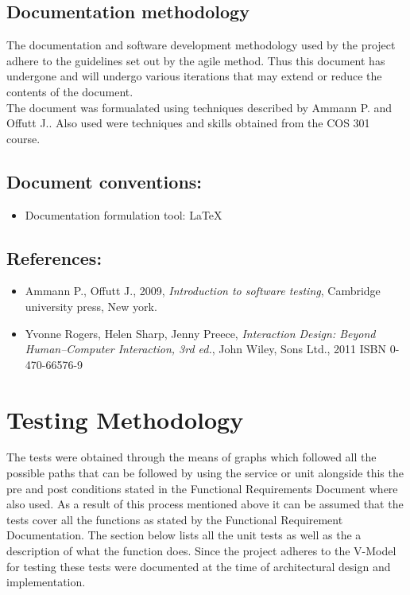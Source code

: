 \documentclass[12pt]{article}
\begin{document}
\vspace{0.2in}

\subsection{Documentation methodology}
\vspace{0.2in}
\begin{flushleft}
The documentation and software development methodology used by the project adhere to the guidelines set out by the agile method. Thus this document has undergone and will undergo various iterations that may extend or reduce the contents of the document.\\

The document was formualated using techniques described by Ammann P. and Offutt J.. Also used were techniques and skills obtained from the COS 301 course. 

\vspace{0.5in}

\subsection{Document conventions:}
\vspace{0.1in}
\begin{itemize}
\item Documentation formulation tool: LaTeX
\end{itemize}

\vspace{0.2in}
\subsection{References:}
\vspace{0.1in}
\begin{itemize}
\item Ammann P., Offutt J., 2009, \textit{Introduction to software testing}, Cambridge university press, New york.
\item Yvonne Rogers, Helen Sharp,  Jenny Preece,\textit{  Interaction Design: Beyond Human–Computer Interaction, 3rd ed.}, John Wiley, Sons Ltd., 2011 ISBN 0-470-66576-9
\end{itemize}	
\end{flushleft}
\vspace{0.5in}


\newpage
\section{Testing Methodology}
The tests were obtained through the means of graphs which followed all the possible paths that can be followed by using the service or unit alongside this the pre and post conditions stated in the Functional Requirements Document where also used. As a result of this process mentioned above it can be assumed that the tests cover all the functions as stated by the Functional Requirement Documentation. The section below lists all the unit tests as well as the a description of what the function does. Since the project adheres to the V-Model for testing these tests were documented at the time of architectural design and implementation.
\end{document}
